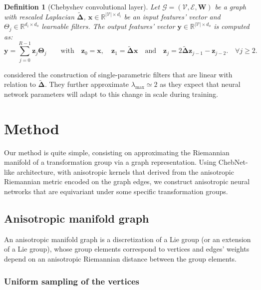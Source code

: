 \documentclass{article}
\newtheorem{definition}{Definition}[section]
\begin{document}
\begin{definition}[Chebyshev convolutional layer] \label{def:cheb_conv}
Let $\mathcal{G} = (\mathcal{V}, \mathcal{E}, \boldsymbol{W})$ be a graph with rescaled Laplacian $\boldsymbol{\tilde{\Delta}}$, $\boldsymbol{x} \in \mathbb{R}^{|\mathcal{V}| \times d_i}$  be an input features' vector and $\Theta_j \in \mathbb{R}^{d_i \times d_o}$ learnable filters. The output features' vector $\boldsymbol{y} \in \mathbb{R}^{|\mathcal{V}| \times d_o}$ is computed as:
\begin{equation}
\boldsymbol{y} = \sum_{j=0}^{R-1} \boldsymbol{z}_j \boldsymbol{\Theta}_j \qquad \text{with} \quad \boldsymbol{z}_0 = \boldsymbol{x}, \quad \boldsymbol{z}_1 = \boldsymbol{\tilde{\Delta} x} \quad  \text{and} \quad \boldsymbol{z}_j = 2 \boldsymbol{\tilde{\Delta} z}_{j-1} - \boldsymbol{z}_{j-2}. \quad \forall j \geq 2.
\end{equation}
\end{definition}


\citet{kipf2016gcn} considered the construction of single-parametric filters that are linear with relation to $\boldsymbol{\tilde{\Delta}}$. They further approximate $\lambda_{\max} \simeq 2$ as they expect that neural network parameters will adapt to this change in scale during training.

\section{Method} \label{sec:method}

Our method is quite simple, consisting on approximating the Riemannian manifold of a transformation group via a graph representation. Using ChebNet-like architecture, with anisotropic kernels that derived from the anisotropic Riemannian metric encoded on the graph edges, we construct anisotropic neural networks that are equivariant under some specific transformation groups.

\subsection{Anisotropic manifold graph}

An anisotropic manifold graph is a discretization of a Lie group (or an extension of a Lie group), whose group elements correspond to vertices and edges' weights depend on an anisotropic Riemannian distance between the group elements. 

\subsubsection{Uniform sampling of the vertices}
\end{document}
